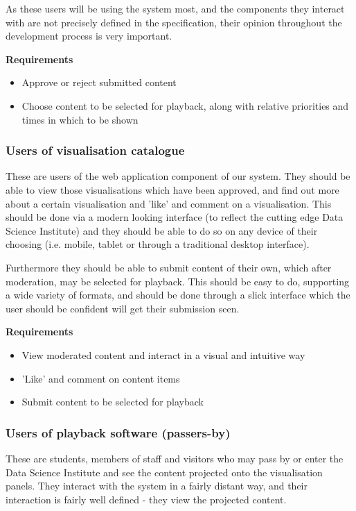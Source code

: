 \documentclass[a4paper, titlepage]{article}
\begin{document}
As these users will be using the system most, and the components they interact with are not precisely defined in the specification, their opinion throughout the development process is very important.

\textbf{Requirements}
\begin{itemize}
\item Approve or reject submitted content
\item Choose content to be selected for playback, along with relative priorities and times in which to be shown
\end{itemize}

\subsubsection{Users of visualisation catalogue}

These are users of the web application component of our system. They should be able to view those visualisations which have been approved, and find out more about a certain visualisation and 'like' and comment on a visualisation. This should be done via a modern looking interface (to reflect the cutting edge Data Science Institute) and they should be able to do so on any device of their choosing (i.e. mobile, tablet or through a traditional desktop interface).

Furthermore they should be able to submit content of their own, which after moderation, may be selected for playback. This should be easy to do, supporting a wide variety of formats, and should be done through a slick interface which the user should be confident will get their submission seen.

\textbf{Requirements}
\begin{itemize}
\item View moderated content and interact in a visual and intuitive way
\item 'Like' and comment on content items
\item Submit content to be selected for playback
\end{itemize}

\subsubsection{Users of playback software (passers-by)}

These are students, members of staff and visitors who may pass by or enter the Data Science Institute and see the content projected onto the visualisation panels. They interact with the system in a fairly distant way, and their interaction is fairly well defined - they view the projected content.
\end{document}
